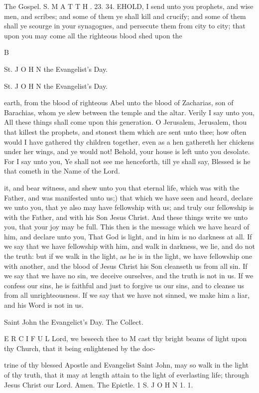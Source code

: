 The Gospel. S. M A T T H . 23. 34. EHOLD, I send unto you prophets, and wise men, and scribes; and some of them ye shall kill and crucify; and some of them shall ye scourge in your synagogues, and persecute them from city to city; that upon you may come all the righteous blood shed upon the

B

St. J O H N the Evangelist’s Day.

St. J O H N the Evangelist’s Day.

earth, from the blood of righteous Abel unto the blood of Zacharias, son of Barachias, whom ye slew between the temple and the altar. Verily I say unto you, All these things shall come upon this generation. O Jerusalem, Jerusalem, thou that killest the prophets, and stonest them which are sent unto thee; how often would I have gathered thy children together, even as a hen gathereth her chickens under her wings, and ye would not! Behold, your house is left unto you desolate. For I say unto you, Ye shall not see me henceforth, till ye shall say, Blessed is he that cometh in the Name of the Lord.

it, and bear witness, and shew unto you that eternal life, which was with the Father, and was manifested unto us;) that which we have seen and heard, declare we unto you, that ye also may have fellowship with us; and truly our fellowship is with the Father, and with his Son Jesus Christ. And these things write we unto you, that your joy may be full. This then is the message which we have heard of him, and declare unto you, That God is light, and in him is no darkness at all. If we say that we have fellowship with him, and walk in darkness, we lie, and do not the truth: but if we walk in the light, as he is in the light, we have fellowship one with another, and the blood of Jesus Christ his Son cleanseth us from all sin. If we say that we have no sin, we deceive ourselves, and the truth is not in us. If we confess our sins, he is faithful and just to forgive us our sins, and to cleanse us from all unrighteousness. If we say that we have not sinned, we make him a liar, and his Word is not in us.

Saint John the Evangelict’s Day. The Collect.

E R C I F U L Lord, we beseech thee to M cast thy bright beams of light upon thy Church, that it being enlightened by the doc-

trine of thy blessed Apostle and Evangelist Saint John, may so walk in the light of thy truth, that it may at length attain to the light of everlasting life; through Jesus Christ our Lord. Amen. The Epictle. 1 S. J O H N 1. 1.


